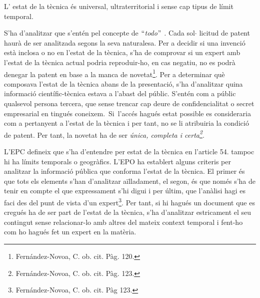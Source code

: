 \documentclass[12pt]{article}
\renewcommand{\_}{\kern-1.5pt\textunderscore\kern-1.5pt}
\begin{document}
\begin{itemize}
\begin{justify}
L’ estat de la tècnica és universal, ultraterritorial i sense cap tipus de límit temporal. 
\end{justify}\par


\vspace{\baselineskip}
\begin{justify}
S’ha d’analitzar que s’entén pel concepte de \textit{$``$todo$"$ .} Cada sol$ \cdot $ licitud de patent haurà de ser analitzada segons la seva naturalesa. Per a decidir si una invenció està inclosa o no en l’estat de la tècnica, s’ha de comprovar si un expert amb l’estat de la tècnica actual podria reproduir-ho, en cas negatiu, no es podrà denegar la patent en base a la manca de novetat\footnote{ Fernández-Novoa, C. ob. cit. Pàg. 120. }.  Per a determinar què composava l’estat de la tècnica abans de la presentació, s’ha d’analitzar quina informació científic-tècnica estava a l’abast del públic. S’entén com a públic qualsevol persona tercera, que sense trencar cap deure de confidencialitat o secret empresarial en tingués coneixem.\ Si\ l’accés hagués estat possible es consideraria com a pertanyent a l’estat de la tècnica i per tant, no se li atribuiria la condició de patent.   Per tant, la novetat ha de ser \textit{única, completa i certa\footnote{ Fernández-Novoa, C. ob. cit. Pàg. 123. }}.  
\end{justify}\par


\vspace{\baselineskip}
\begin{justify}
L’EPC defineix que s’ha d’entendre per estat de la tècnica en l’article 54.\textit{ }tampoc hi ha límits temporals o geogràfics. L’EPO ha establert alguns criteris per analitzar la informació pública que conforma l’estat de la tècnica. El primer és que tots els elements s’han d’analitzar aïlladament, el segon, és que només s’ha de tenir en compte el que expressament s’hi digui i per últim, que l’anàlisi hagi es faci des del punt de vista d’un expert\footnote{ Fernández-Novoa, C. ob. cit. Pàg 123.  }. Per tant, si hi hagués un document que es cregués ha de ser part de l’estat de la tècnica, s’ha d’analitzar estricament el seu contingut sense relacionar-lo amb altres del mateix context temporal i fent-ho com ho hagués fet un expert en la matèria. 
\end{justify}\par



\end{itemize}
\end{document}
